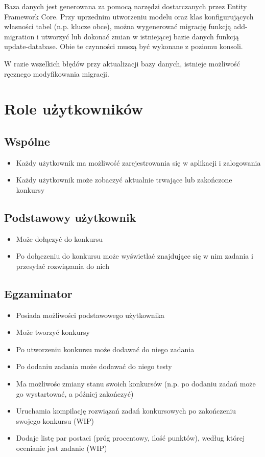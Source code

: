 \documentclass{article}
\begin{document}
Baza danych jest generowana za pomocą narzędzi dostarczanych przez Entity Framework Core. Przy uprzednim utworzeniu modelu oraz klas konfigurujących własności tabel (n.p. klucze obce), można wygenerować migrację funkcją add-migration i utworzyć lub dokonać zmian w istniejącej bazie danych funkcją update-database. Obie te czynności muszą być wykonane z poziomu konsoli. 

W razie wszelkich błędów przy aktualizacji bazy danych, istnieje możliwość ręcznego modyfikowania migracji.

\section{Role użytkowników}
\subsection{Wspólne}
\begin{itemize}
    \item Każdy użytkownik ma możliwość zarejestrowania się w aplikacji i zalogowania
    \item Każdy użytkownik może zobaczyć aktualnie trwające lub zakończone konkursy
\end{itemize}

\subsection{Podstawowy użytkownik}
\begin{itemize}
    \item Może dołączyć do konkursu
    \item Po dołączeniu do konkursu może wyświetlać znajdujące się w nim zadania i przesyłać rozwiązania do nich
\end{itemize}

\subsection{Egzaminator}
\begin{itemize}
    \item Posiada możliwości podstawowego użytkownika
    \item Może tworzyć konkursy
    \item Po utworzeniu konkursu może dodawać do niego zadania
    \item Po dodaniu zadania może dodawać do niego testy
    \item Ma możliwośc zmiany stanu swoich konkursów (n.p. po dodaniu zadań może go wystartować, a później zakończyć)
    \item Uruchamia kompilację rozwiązań zadań konkursowych po zakończeniu swojego konkursu (WIP)
    \item Dodaje listę par postaci (próg procentowy, ilość punktów), według której ocenianie jest zadanie (WIP)
\end{itemize}
\end{document}
